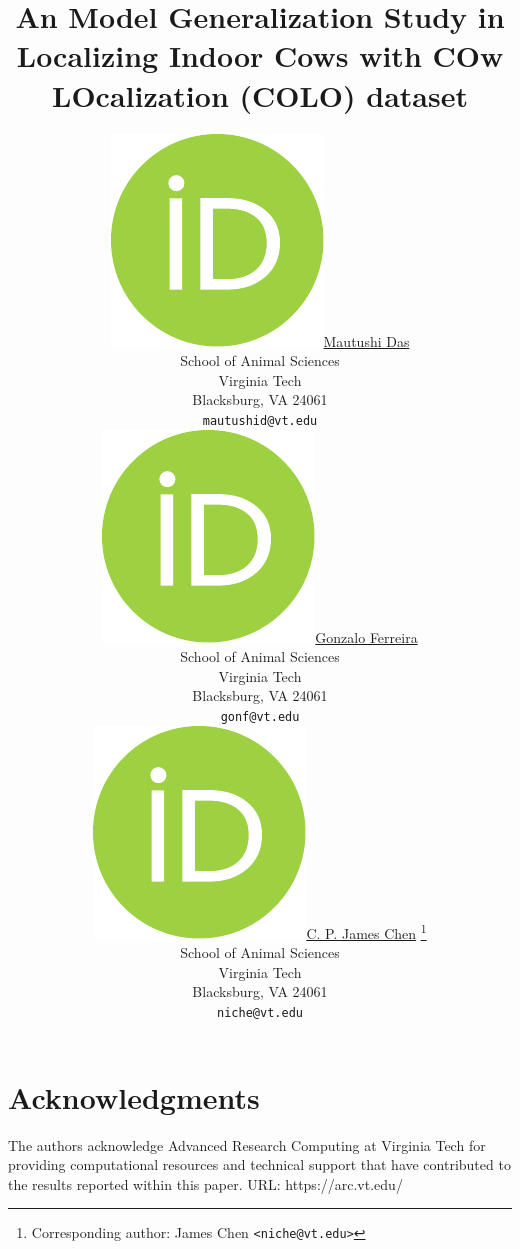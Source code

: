 \documentclass{article}
\title{An Model Generalization Study in Localizing Indoor Cows with COw LOcalization (COLO) dataset}
\author{
    \href{https://orcid.org/0000-0000-0000-0000}{\includegraphics[scale=0.06]{orcid.pdf}\hspace{1mm}Mautushi Das} \\
	School of Animal Sciences\\
	Virginia Tech\\
	Blacksburg, VA 24061 \\
	\texttt{mautushid@vt.edu} \\
	\And
	\href{https://orcid.org/0000-0000-0000-0000}{\includegraphics[scale=0.06]{orcid.pdf}\hspace{1mm}Gonzalo Ferreira} \\
	School of Animal Sciences\\
	Virginia Tech\\
	Blacksburg, VA 24061 \\
	\texttt{gonf@vt.edu} \\
	\And
	\href{https://orcid.org/0000-0000-0000-0000}{\includegraphics[scale=0.06]{orcid.pdf}\hspace{1mm}C. P. James Chen} \thanks{Corresponding author: James Chen \texttt{<niche@vt.edu>}}\\
	School of Animal Sciences\\
	Virginia Tech\\
	Blacksburg, VA 24061 \\
	\texttt{niche@vt.edu}
}
\begin{document}
\maketitle


\newpage





\section*{Acknowledgments}
The authors acknowledge Advanced Research Computing at Virginia Tech for providing computational resources and technical support that have contributed to the results reported within this paper. URL: https://arc.vt.edu/






\newpage


\end{document}
